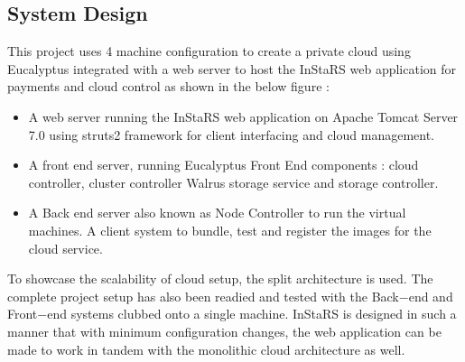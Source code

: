 \documentclass[a4page,12pt]{article}
\begin{document}
\subsection{System Design}
This project uses 4 machine configuration to create a private cloud using Eucalyptus integrated with a web server to host the InStaRS web application for payments and cloud control as shown in the below figure :\\
\begin{itemize}
\item A web server running the InStaRS web application on Apache Tomcat Server 7.0 using struts2 framework for client interfacing and cloud management.
\item A front end server, running Eucalyptus Front End components : cloud controller, cluster controller Walrus storage  service and storage controller.
\item A Back end server also known as Node Controller to run the virtual machines.
A client system to bundle, test and register the images for the cloud service.
\end{itemize}
To showcase the scalability of cloud setup, the split architecture is used. The complete project setup has also been readied and tested with the Back$-$end and Front$-$end systems clubbed onto a single machine. InStaRS is designed in such a manner that with minimum configuration changes, the web application can be made to work in tandem with the monolithic cloud architecture as well.
\end{document}

